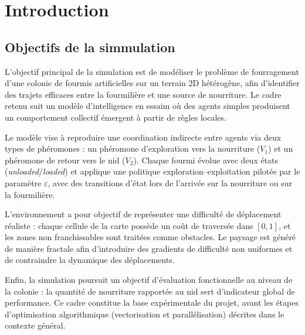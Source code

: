 \section{Introduction}

\subsection{Objectifs de la simmulation}

L'objectif principal de la simulation est de modéliser le problème de fourragement d'une colonie de fourmis 
artificielles sur un terrain 2D hétérogène, afin d'identifier des trajets efficaces entre la fourmilière et 
une source de nourriture. Le cadre retenu suit un modèle d'intelligence en essaim où des agents simples 
produisent un comportement collectif émergent à partir de règles locales.


Le modèle vise à reproduire une coordination indirecte entre agents via deux types de phéromones : un 
phéromone d'exploration vers la nourriture ($V_1$) et un phéromone de retour vers le nid ($V_2$). Chaque 
fourmi évolue avec deux états (\textit{unloaded}/\textit{loaded}) et applique une politique 
exploration--exploitation pilotée par le paramètre $\varepsilon$, avec des transitions d'état lors de 
l'arrivée sur la nourriture ou sur la fourmilière.


L'environnement a pour objectif de représenter une difficulté de déplacement réaliste : chaque cellule de la 
carte possède un coût de traversée dans $[0,1]$, et les zones non franchissables sont traitées comme obstacles. 
Le paysage est généré de manière fractale afin d'introduire des gradients de difficulté non uniformes et de 
contraindre la dynamique des déplacements.


Enfin, la simulation poursuit un objectif d'évaluation fonctionnelle au niveau de la colonie : la quantité 
de nourriture rapportée au nid sert d'indicateur global de performance. Ce cadre constitue la base 
expérimentale du projet, avant les étapes d'optimisation algorithmique (vectorisation et parallélisation)
 décrites dans le contexte général.